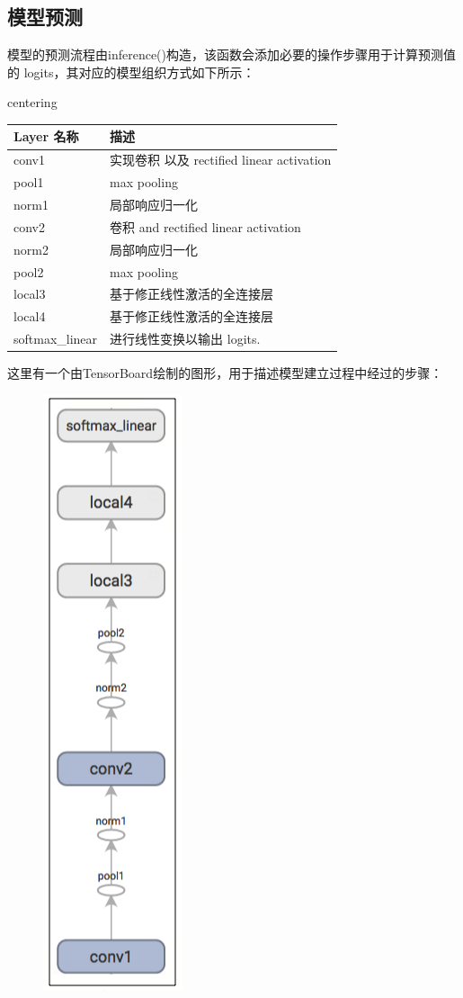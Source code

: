 \documentclass[11pt,fleqn]{book}
\begin{document}
{\subsection{模型预测}
模型的预测流程由inference()构造，该函数会添加必要的操作步骤用于计算预测值的 logits，其对应的模型组织方式如下所示：
\begin{table}[!h]
centering
\begin{tabular}{|p{2cm}|p{8cm}|}
\hline
Layer 名称&描述\\
\hline
conv1&实现卷积 以及 rectified linear activation\\
\hline
pool1&max pooling\\
\hline
norm1&局部响应归一化\\
\hline
conv2&卷积 and rectified linear activation\\
\hline
norm2&局部响应归一化\\
\hline
pool2&max pooling\\
\hline
local3&基于修正线性激活的全连接层\\
\hline
local4&基于修正线性激活的全连接层\\
\hline
softmax\_linear&进行线性变换以输出 logits.
\hline
\end{tabular}
\end{table}
这里有一个由TensorBoard绘制的图形，用于描述模型建立过程中经过的步骤：
\begin{figure}[H]
\centering
\includegraphics[scale=0.6]{cifar_graph.png}

\end{figure}}
\end{document}
